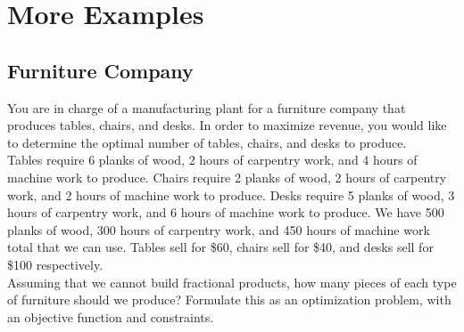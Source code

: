 \documentclass[12pt]{article}
\begin{document}
%

\section{More Examples}

\subsection{Furniture Company}
You are in charge of a manufacturing plant for a furniture company that produces tables, chairs, and desks.  
In order to maximize revenue, you would like to determine the optimal number of tables, chairs, and desks to produce.  \\

Tables require 6 planks of wood, 2 hours of carpentry work, and 4 hours of machine work to produce.  Chairs require 2 planks of wood, 2 hours of carpentry work, and 2 hours of machine work to produce.  Desks require 5 planks of wood, 3 hours of carpentry work, and 6 hours of machine work to produce.  We have 500 planks of wood, 300 hours of carpentry work, and 450 hours of machine work total that we can use.  Tables sell for \$60, chairs sell for \$40, and desks sell for \$100 respectively.  \\

Assuming that we cannot build fractional products, how many pieces of each type of furniture should we produce?  Formulate this as an optimization problem, with an objective function and constraints.  
\end{document}
